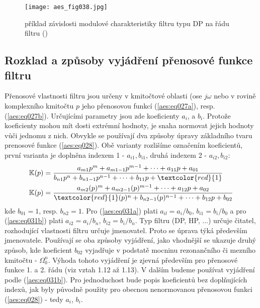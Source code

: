       \begin{figure}[ht!]  %
        \centering
        \texttt{[image: aes\_fig038.jpg]}
        \caption{příklad závislosti modulové charakteristiky filtru typu DP na řádu filtru
                (\cite[s.~37]{HajekSedlacek2002})}
        \label{aes:fig038}    
      \end{figure}

    \subsection{Rozklad a způsoby vyjádření přenosové funkce filtru}
      Přenosové vlastnosti filtru jsou určeny v kmitočtové oblasti (ose \(j\omega\) nebo v rovině
      komplexního kmitočtu \(p\) jeho přenosovou funkcí (\ref{aes:eq027a}), resp.
      (\ref{aes:eq027b}). Určujícími parametry jsou zde koeficienty \(a_i\), a \(b_i\). Protože
      koeficienty mohou mít dosti extrémní hodnoty, je snaha normovat jejich hodnoty vůči jednomu z
      nich. Obvykle se používají dva způsoby úpravy základního tvaru prenosové funkce
      (\ref{aes:eq028}). Obě varianty rozlišíme označením koeficientů, první varianta je doplněna
      indexem 1 - \(a_{i1}, b_{i1}\), druhá indexem 2 - \(a_{i2}, b_{i2}\): 
      \begin{subequations}
        \begin{align}
          \mathbb{K}(p) 
            &= \frac{a_{m1}p^m + a_{m1-1}p^{m-1} + \cdots + a_{11}p +a_{01}}
                    {b_{n1}p^n + b_{n1-1}p^{n-1} + \cdots + b_{11}p +\textcolor{red}{1}}  
                    \label{aes:eq031a}                                                        \\
          \mathbb{K}(p) 
            &= \frac{a_{m2}(p)^m + a_{m2-1}(p)^{m-1} + \cdots + a_{12}p +a_{02}}
                    {\textcolor{red}{1}(p)^n + b_{n2-1}(p)^{n-1} + \cdots + b_{12}p +b_{02}} 
                    \label{aes:eq031b}
        \end{align}
      \end{subequations} 
      kde \(b_{01} = 1\), resp. \(b_{n2} = 1\). Pro (\ref{aes:eq031a}) plati \(a_{il} = a_i/b_0\),
      \(b_{i1} = b_i/b_0\) a pro (\ref{aes:eq031b}) plati \(a_{i2} = a_i/b_n\), \(b_{i2} =
      b_i/b_n\). Typ filtru (DP, HP, ...) určuje čitatel, rozhodující vlastnosti filtru určuje
      jmenovatel. Proto se úprava týká především jmenovatele. Používají se oba způsoby vyjádření,
      jako vhodnější se ukazuje druhý způsob, kde koeficient \(b_{02}\) vyjadřuje v podstatě mocninu
      rezonančního či mezního kmitočtu - \(\Omega_0^n\). Výhoda tohoto vyjádření je zjevná především
      pro přenosové funkce 1. a 2. řádu (viz vztah 1.12 až 1.13). V dalším budeme používat vyjádření
      podle (\ref{aes:eq031b}). Pro jednoduchost bude popis koeficientů bez doplňujících indexů, jak
      byly původně použity pro obecnou nenormovanou přenosovou funkci (\ref{aes:eq028}) - tedy
      \(a_i\), \(b_i\). 
      
